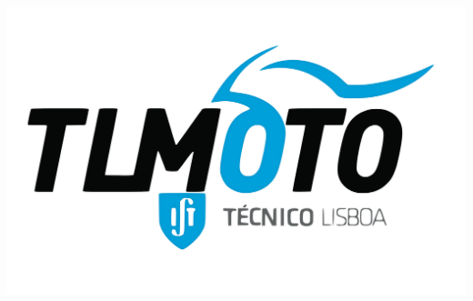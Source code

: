 \begin{titlepage}
\begin{center}
\end{center}
\vspace*{0.35cm}


    \includegraphics[scale=0.09]{imagens/tlmoto.png}\\[1cm]
   

\pagebreak
\end{titlepage}